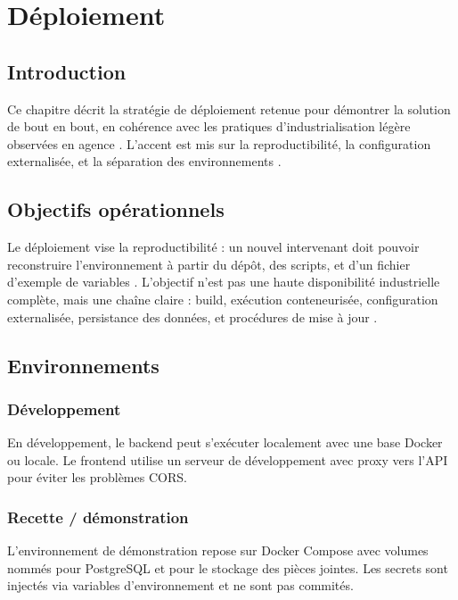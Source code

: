 \chapter{Déploiement}
\label{chap:deploiement}

\section{Introduction}

Ce chapitre décrit la stratégie de déploiement retenue pour démontrer la solution de bout en bout, en cohérence avec les pratiques d'industrialisation légère observées en agence \cite{dockerdoc,twelvefactor}. L'accent est mis sur la reproductibilité, la configuration externalisée, et la séparation des environnements \cite{bass2021,sommerville2016}.

\section{Objectifs opérationnels}

Le déploiement vise la reproductibilité : un nouvel intervenant doit pouvoir reconstruire l'environnement à partir du dépôt, des scripts, et d'un fichier d'exemple de variables \cite{twelvefactor}. L'objectif n'est pas une haute disponibilité industrielle complète, mais une chaîne claire : build, exécution conteneurisée, configuration externalisée, persistance des données, et procédures de mise à jour \cite{dockerdoc}.

\section{Environnements}

\subsection{Développement}

En développement, le backend peut s'exécuter localement avec une base Docker ou locale. Le frontend utilise un serveur de développement avec proxy vers l'API pour éviter les problèmes CORS.

\subsection{Recette / démonstration}

L'environnement de démonstration repose sur Docker Compose avec volumes nommés pour PostgreSQL et pour le stockage des pièces jointes. Les secrets sont injectés via variables d'environnement et ne sont pas commités.

